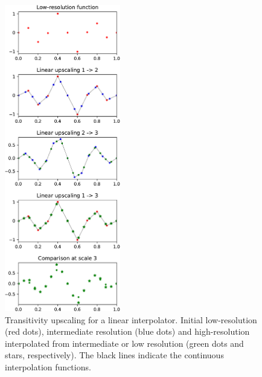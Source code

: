 \documentclass[12pt]{scrartcl}
\begin{document}
\begin{figure}[!h]
\begin{center}
\includegraphics[width=0.45\textwidth]{interpolation_comparison_lin.pdf}
\end{center}
\caption{\label{fig:lin} Transitivity upscaling for a linear interpolator. Initial low-resolution (red dots), intermediate resolution (blue dots) and high-resolution interpolated from intermediate or low resolution (green dots and stars, respectively). The black lines indicate the continuous interpolation functions.}
\end{figure}
\end{document}
